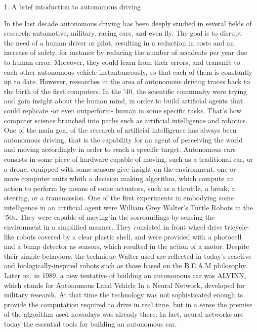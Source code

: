 1. A brief intoduction to autonomous driving

In the last decade autonomous driving has been deeply studied in several fields of research: automotive, military, racing cars, and even fly. The goal is to disrupt the need of a human driver or pilot, resulting in a reduction in costs and an increase of safety, for instance by reducing the number of accidents per year due to human error. Moreover, they could learn from their errors, and transmit to each other autonomous vehicle instantaneously, so that each of them is constantly up to date.
However, researches in the area of autonomous driving traces back to the birth of the first computers. In the '40, the scientific community were trying and gain insight about the human mind, in order to build artificial agents that could replicate -or even outperform- human in some specific tasks.
That's how computer science branched into paths such as artificial intelligence and robotics.
One of the main goal of the research of artificial intelligence has always been autonomous driving, that is the capability for an agent of perceiving the world and moving accordingly in order to reach a specific target.
Autonomous cars consists in some piece of hardware capable of moving, such as a traditional car, or a drone, equipped with some sensors give insight on the environment, one or more computer units whith a decision making algorithm, which compute an action to perform by means of some actuators, such as a throttle, a break, a steering, or a transmission.
One of the first experiments in embodying some intelligence in an artificial agent were William Grey Walter's Turtle Robots in the '50s. They were capable of moving in the sorroundings by sensing the environment in a simplified manner. They consisted in front wheel drive tricycle-like robots covered by a clear plastic shell, and were provided with a photocell and a bump detector as sensors, which resulted in the action of a motor. Despite their simple behaviors, the technique Walter used are reflected in today's reactive and biologically-inspired robots such as those based on the B.E.A.M philosophy.
Later on, in 1989, a new tentative of building an autonomous car was ALVINN, which stands for Autonomous Land Vehicle In a Neural Network, developed for military research.
At that time the technology was not sophisticated enough to provide the computation required to drive in real time, but in a sense the premise of the algorithm used nowadays was already there. In fact, neural networks are today the essential tools for building an autonomous car.
